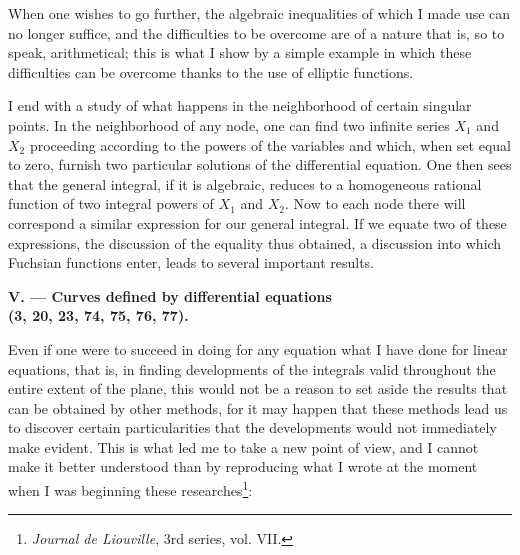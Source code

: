 \documentclass[11pt]{article}
\begin{document}
When one wishes to go further, the algebraic inequalities of which I made use can no longer suffice, and the difficulties to be overcome are of a nature that is, so to speak, arithmetical; this is what I show by a simple example in which these difficulties can be overcome thanks to the use of elliptic functions.

I end with a study of what happens in the neighborhood of certain singular points. In the neighborhood of any node, one can find two infinite series $X_1$ and $X_2$ proceeding according to the powers of the variables and which, when set equal to zero, furnish two particular solutions of the differential equation. One then sees that the general integral, if it is algebraic, reduces to a homogeneous rational function of two integral powers of $X_1$ and $X_2$. Now to each node there will correspond a similar expression for our general integral. If we equate two of these expressions, the discussion of the equality thus obtained, a discussion into which Fuchsian functions enter, leads to several important results.

\begin{center}
\textbf{V. — Curves defined by differential equations\\
(3, 20, 23, 74, 75, 76, 77).}
\end{center}

Even if one were to succeed in doing for any equation what I have done for linear equations, that is, in finding developments of the integrals valid throughout the entire extent of the plane, this would not be a reason to set aside the results that can be obtained by other methods, for it may happen that these methods lead us to discover certain particularities that the developments would not immediately make evident. This is what led me to take a new point of view, and I cannot make it better understood than by reproducing what I wrote at the moment when I was beginning these researches\footnote[1]{\emph{Journal de Liouville}, 3rd series, vol. VII.}:
\end{document}
